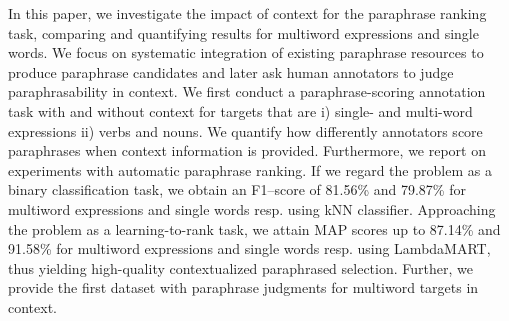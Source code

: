 In this paper, we  investigate the impact of context for the paraphrase ranking task, comparing and quantifying results for multiword expressions and single words. We focus on systematic integration of existing paraphrase resources to produce paraphrase candidates and later ask human annotators to judge paraphrasability in context. We first conduct a paraphrase-scoring annotation task with and without context for targets that are i) single- and multi-word expressions ii) verbs and nouns. We quantify how differently annotators score paraphrases when context information is provided. Furthermore, we report on experiments with automatic paraphrase ranking. If we regard the problem as a binary classification task, we obtain an F1--score of 81.56\% and 79.87\% for multiword expressions and single words resp. using kNN classifier. Approaching the problem as a learning-to-rank task, we attain MAP scores up to 87.14\%  and 91.58\% for multiword expressions and single words resp.  using LambdaMART, thus yielding high-quality contextualized paraphrased selection. Further, we provide the first dataset with paraphrase judgments for multiword targets in context.
